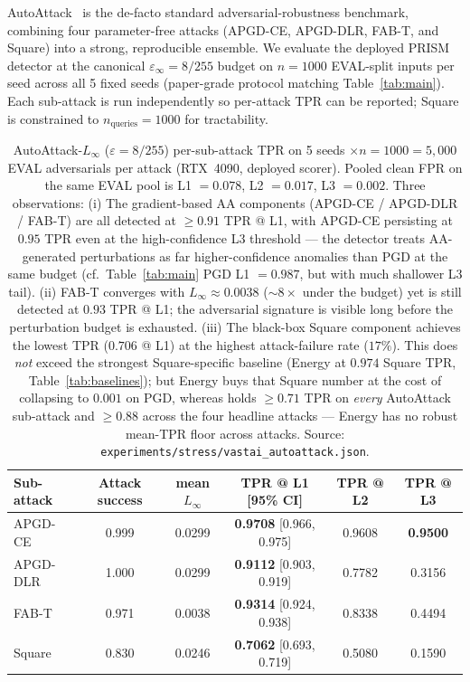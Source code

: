 AutoAttack~\cite{croce2020reliable} is the de-facto standard
adversarial-robustness benchmark, combining four parameter-free attacks
(APGD-CE, APGD-DLR, FAB-T, and Square) into a strong, reproducible
ensemble. We evaluate the deployed PRISM detector at the canonical
$\varepsilon_\infty{=}8/255$ budget on $n{=}1000$ EVAL-split inputs per
seed across all 5 fixed seeds (paper-grade protocol matching
Table~\ref{tab:main}). Each sub-attack is run independently so per-attack
TPR can be reported; Square is constrained to $n_\text{queries}{=}1000$
for tractability.

\begin{table}[h]
\centering
\small
\begin{tabular}{lccccc}
\toprule
Sub-attack & Attack success & mean $L_\infty$ & TPR @ L1 [95\% CI] & TPR @ L2 & TPR @ L3 \\
\midrule
APGD-CE  & 0.999 & 0.0299 & \textbf{0.9708} [0.966, 0.975] & 0.9608 & \textbf{0.9500} \\
APGD-DLR & 1.000 & 0.0299 & \textbf{0.9112} [0.903, 0.919] & 0.7782 & 0.3156 \\
FAB-T    & 0.971 & 0.0038 & \textbf{0.9314} [0.924, 0.938] & 0.8338 & 0.4494 \\
Square   & 0.830 & 0.0246 & \textbf{0.7062} [0.693, 0.719] & 0.5080 & 0.1590 \\
\bottomrule
\end{tabular}
\caption{AutoAttack-$L_\infty$ ($\varepsilon{=}8/255$) per-sub-attack TPR
on 5 seeds $\times n{=}1000 = 5{,}000$ EVAL adversarials per attack
(RTX~4090, deployed scorer). Pooled clean FPR on the same EVAL pool is
L1 $=0.078$, L2 $=0.017$, L3 $=0.002$. Three observations:
(i) The gradient-based AA components (APGD-CE / APGD-DLR / FAB-T) are
all detected at $\geq 0.91$ TPR @ L1, with APGD-CE persisting at
$0.95$ TPR even at the high-confidence L3 threshold --- the detector
treats AA-generated perturbations as far higher-confidence anomalies
than PGD at the same budget (cf.\ Table~\ref{tab:main} PGD L1
$=0.987$, but with much shallower L3 tail).
(ii) FAB-T converges with $L_\infty \approx 0.0038$ ($\sim 8{\times}$
under the budget) yet is still detected at $0.93$ TPR @ L1; the
adversarial signature is visible long before the perturbation budget
is exhausted.
(iii) The black-box Square component achieves the lowest TPR
($0.706$ @ L1) at the highest attack-failure rate ($17\%$). This does
\emph{not} exceed the strongest Square-specific baseline (Energy at
$0.974$ Square TPR, Table~\ref{tab:baselines}); but Energy buys that
Square number at the cost of collapsing to $0.001$ on PGD, whereas
\prism holds $\ge 0.71$ TPR on \emph{every} AutoAttack sub-attack and
$\ge 0.88$ across the four headline attacks --- Energy has no robust
mean-TPR floor across attacks. Source:
\texttt{experiments/stress/vastai\_autoattack.json}.}
\label{tab:autoattack}
\end{table}

